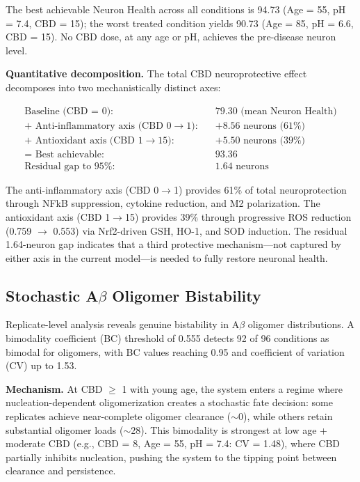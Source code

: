 \documentclass[10pt,letterpaper]{article}
\begin{document}
The best achievable Neuron Health across all conditions is 94.73 (Age = 55, pH = 7.4, CBD = 15); the worst treated condition yields 90.73 (Age = 85, pH = 6.6, CBD = 15). No CBD dose, at any age or pH, achieves the pre-disease neuron level.

\vspace{3pt}
\noindent\textbf{Quantitative decomposition.} The total CBD neuroprotective effect decomposes into two mechanistically distinct axes:

\begin{align}
\text{Baseline (CBD = 0):} \quad & 79.30 \text{ (mean Neuron Health)} \nonumber \\
+ \text{ Anti-inflammatory axis (CBD } 0 \to 1\text{):} \quad & +8.56 \text{ neurons (61\%)} \nonumber \\
+ \text{ Antioxidant axis (CBD } 1 \to 15\text{):} \quad & +5.50 \text{ neurons (39\%)} \nonumber \\
= \text{ Best achievable:} \quad & 93.36 \nonumber \\
\text{Residual gap to 95\%:} \quad & 1.64 \text{ neurons}
\end{align}

The anti-inflammatory axis (CBD 0$\to$1) provides 61\% of total neuroprotection through NFkB suppression, cytokine reduction, and M2 polarization. The antioxidant axis (CBD 1$\to$15) provides 39\% through progressive ROS reduction (0.759 $\to$ 0.553) via Nrf2-driven GSH, HO-1, and SOD induction. The residual 1.64-neuron gap indicates that a third protective mechanism---not captured by either axis in the current model---is needed to fully restore neuronal health.

\subsection{Stochastic A$\beta$ Oligomer Bistability}

Replicate-level analysis reveals genuine bistability in A$\beta$ oligomer distributions. A bimodality coefficient (BC) threshold of 0.555 detects 92 of 96 conditions as bimodal for oligomers, with BC values reaching 0.95 and coefficient of variation (CV) up to 1.53.

\vspace{3pt}
\noindent\textbf{Mechanism.} At CBD $\geq$ 1 with young age, the system enters a regime where nucleation-dependent oligomerization creates a stochastic fate decision: some replicates achieve near-complete oligomer clearance ($\sim$0), while others retain substantial oligomer loads ($\sim$28). This bimodality is strongest at low age + moderate CBD (e.g., CBD = 8, Age = 55, pH = 7.4: CV = 1.48), where CBD partially inhibits nucleation, pushing the system to the tipping point between clearance and persistence.
\end{document}
